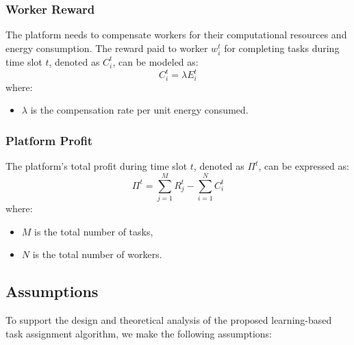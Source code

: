 \subsubsection{Worker Reward}
The platform needs to compensate workers for their computational resources and energy consumption. The reward paid to worker \( w_i^t \) for completing tasks during time slot \( t \), denoted as \( C_i^t \), can be modeled as:
\[
C_i^t =   \lambda E_i^t
\]
where:
\begin{itemize}
    \item \( \lambda \) is the compensation rate per unit energy consumed.
\end{itemize}

\subsubsection{Platform Profit}
The platform's total profit during time slot \( t \), denoted as \( \Pi^t \), can be expressed as:
\[
\Pi^t = \sum_{j=1}^{M} R_j^t - \sum_{i=1}^{N} C_i^t
\]
where:
\begin{itemize}
    \item \( M \) is the total number of tasks,
    \item \( N \) is the total number of workers.
\end{itemize}


\subsection{Assumptions}

To support the design and theoretical analysis of the proposed learning-based task assignment algorithm, we make the following assumptions:

